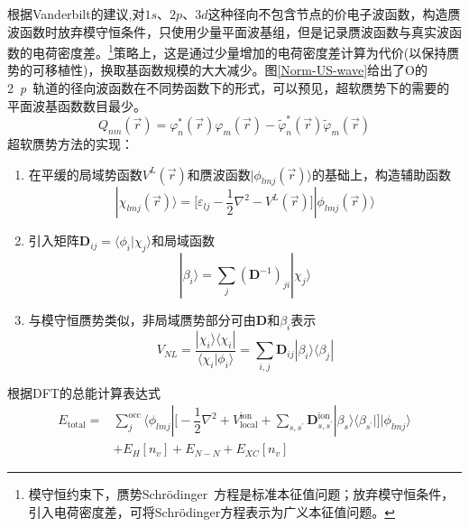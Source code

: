 根据\textrm{Vanderbilt}的建议,对$1s$、$2p$、$3d$这种径向不包含节点的价电子波函数，构造赝波函数时放弃模守恒条件，只使用少量平面波基组，但是记录赝波函数与真实波函数的电荷密度差。\footnote{模守恒约束下，赝势\textrm{Schr\"odinger~}方程是标准本征值问题；放弃模守恒条件，引入电荷密度差，可将\textrm{Schr\"odinger}方程表示为广义本征值问题。}策略上，这是通过少量增加的电荷密度差计算为代价(以保持赝势的可移植性)，换取基函数规模的大大减少。图\ref{Norm-US-wave}给出了\textrm{O}的2~\textit{p}~轨道的径向波函数在不同势函数下的形式，可以预见，超软赝势下的需要的平面波基函数数目最少。
\begin{equation}
	Q_{nm}(\vec r)=\varphi_n^{\ast}(\vec r)\varphi_m(\vec r)-\tilde\varphi_n^{\ast}(\vec r)\tilde\varphi_m(\vec r)
  \label{eq:uspp_4}
\end{equation}
超软赝势方法的实现：
\begin{enumerate}
	\item 在平缓的局域势函数$V^L(\vec r)$和赝波函数$|\phi_{lmj}(\vec r)\rangle$的基础上，构造辅助函数
\begin{equation}
	|\chi_{lmj}(\vec r)\rangle=\bigg[\varepsilon_{lj}-\dfrac12\nabla^2-V^L(\vec r)\bigg]|\phi_{lmj}(\vec r)\rangle
  \label{eq:uspp_1}
\end{equation}
	\item 引入矩阵$\mathbf{D}_{ij}=\langle\phi_i|\chi_j\rangle$和局域函数
\begin{equation}
	|\beta_i\rangle=\sum_j(\mathbf{D}^{-1})_{ji}|\chi_{j}\rangle
  \label{eq:uspp_2}
\end{equation}
	\item 与模守恒赝势类似，非局域赝势部分可由$\mathbf{D}$和$\beta_i$表示
\begin{equation}
	V_{NL}=\dfrac{|\chi_i\rangle\langle\chi_i|}{\langle\chi_i|\phi_i\rangle}=\sum_{i,j}\mathbf{D}_{ij}|\beta_i\rangle\langle\beta_j|
  \label{eq:uspp_3}
\end{equation}
\end{enumerate}
根据DFT的总能计算表达式
	\begin{equation}
		\begin{aligned}
			E_{\mathrm{total}}=&\sum_j^{\mathrm{occ}}\langle\phi_{lmj}|\bigg[-\dfrac12\nabla^2+V_{\mathrm{local}}^{\mathrm{ion}}+\sum_{s,s^{\prime}}\mathbf{D}_{s,s^{\prime}}^{\mathrm{ion}}|\beta_s\rangle\langle\beta_{s^{\prime}}|\bigg]|\phi_{lmj}\rangle\\
			&+E_{H}[n_v]+E_{N-N}+E_{XC}[n_v]
		\end{aligned}
  \label{eq:uspp_5}
	\end{equation}

